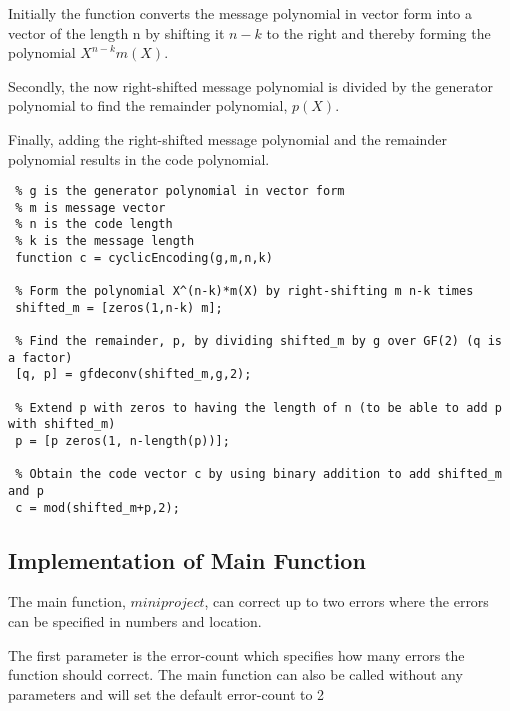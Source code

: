 \documentclass[Main]{subfiles}
\begin{document}
\noindent Initially the function converts the message polynomial in vector form into a vector of the length n by shifting it $n-k$ to the right and thereby forming the polynomial $X^{n-k}m(X)$. 

\noindent Secondly, the now right-shifted message polynomial is divided by the generator polynomial to find the remainder polynomial, $p(X)$.

\noindent Finally, adding the right-shifted message polynomial and the remainder polynomial results in the code polynomial.  

\begin{lstlisting}[caption=Cyclic Encoder, style=Code-Matlab, label=lst:refID]
 % cyclicEncoding is a function that encodes a message vector into systematic code given the following parameters
 % g is the generator polynomial in vector form
 % m is message vector
 % n is the code length
 % k is the message length
 function c = cyclicEncoding(g,m,n,k)

 % Form the polynomial X^(n-k)*m(X) by right-shifting m n-k times 
 shifted_m = [zeros(1,n-k) m];

 % Find the remainder, p, by dividing shifted_m by g over GF(2) (q is a factor)
 [q, p] = gfdeconv(shifted_m,g,2);

 % Extend p with zeros to having the length of n (to be able to add p with shifted_m)
 p = [p zeros(1, n-length(p))];

 % Obtain the code vector c by using binary addition to add shifted_m and p 
 c = mod(shifted_m+p,2);
\end{lstlisting}

\subsection{Implementation of Main Function}
The main function, $miniproject$, can correct up to two errors where the errors can be specified in numbers and location.

The first parameter is the error-count which specifies how many errors the function should correct.
The main function can also be called without any parameters and will set the default error-count to 2   
\end{document}
